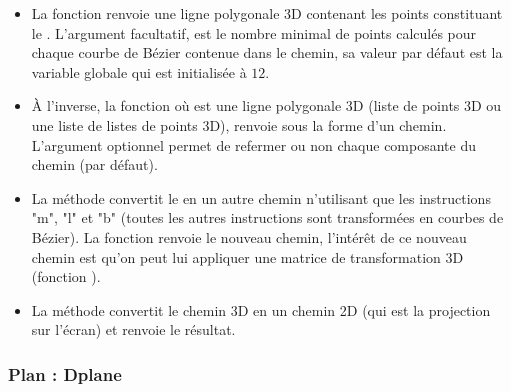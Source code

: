 \begin{itemize}
    \item La fonction  renvoie une ligne polygonale 3D contenant les points constituant le . L'argument facultatif,  est le nombre minimal de points calculés pour chaque courbe de Bézier contenue dans le chemin, sa valeur par défaut est la variable globale  qui est initialisée à $12$.
    
    \item À l'inverse, la fonction  où  est une ligne polygonale 3D (liste de points 3D ou une liste de listes de points 3D), renvoie  sous la forme d'un chemin. L'argument optionnel  permet de refermer ou non chaque composante du chemin (\false par défaut).
    
    \item La méthode  convertit le  en un autre chemin n'utilisant que les instructions "m", "l" et "b" (toutes les autres instructions sont transformées en courbes de Bézier). La fonction renvoie le nouveau chemin, l'intérêt de ce nouveau chemin est qu'on peut lui appliquer une matrice de transformation 3D (fonction ).
    
    \item La méthode  convertit le chemin 3D  en un chemin 2D (qui est la projection sur l'écran) et renvoie le résultat.
\end{itemize}


\subsubsection{Plan : Dplane}

